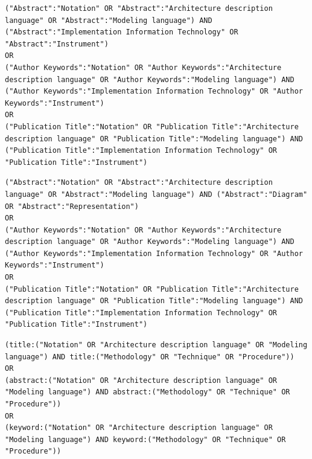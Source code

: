 \begin{tcolorbox}[
	colback=gray!5,
	colframe=black!60,
	title=Cadena de búsqueda en IEEE Xplore para ``Tecnología'',
	fonttitle=\bfseries,
	sharp corners=south
]
\scriptsize
\begin{lstlisting}[breaklines=true]
("Abstract":"Notation" OR "Abstract":"Architecture description language" OR "Abstract":"Modeling language") AND ("Abstract":"Implementation Information Technology" OR "Abstract":"Instrument") 
OR 
("Author Keywords":"Notation" OR "Author Keywords":"Architecture description language" OR "Author Keywords":"Modeling language") AND ("Author Keywords":"Implementation Information Technology" OR "Author Keywords":"Instrument") 
OR 
("Publication Title":"Notation" OR "Publication Title":"Architecture description language" OR "Publication Title":"Modeling language") AND ("Publication Title":"Implementation Information Technology" OR "Publication Title":"Instrument")
\end{lstlisting}
\end{tcolorbox}

\begin{tcolorbox}[
	colback=gray!5,
	colframe=black!60,
	title=Cadena de búsqueda en IEEE Xplore para ``Diseño'',
	fonttitle=\bfseries,
	sharp corners=south
]
\scriptsize
\begin{lstlisting}[breaklines=true]
("Abstract":"Notation" OR "Abstract":"Architecture description language" OR "Abstract":"Modeling language") AND ("Abstract":"Diagram" OR "Abstract":"Representation") 
OR 
("Author Keywords":"Notation" OR "Author Keywords":"Architecture description language" OR "Author Keywords":"Modeling language") AND ("Author Keywords":"Implementation Information Technology" OR "Author Keywords":"Instrument") 
OR 
("Publication Title":"Notation" OR "Publication Title":"Architecture description language" OR "Publication Title":"Modeling language") AND ("Publication Title":"Implementation Information Technology" OR "Publication Title":"Instrument")
\end{lstlisting}
\end{tcolorbox}

\begin{tcolorbox}[
	colback=gray!5,
	colframe=black!60,
	title=Cadena de búsqueda en Springer para ``Metodología'',
	fonttitle=\bfseries,
	sharp corners=south
]
\scriptsize
\begin{lstlisting}[breaklines=true]
(title:("Notation" OR "Architecture description language" OR "Modeling language") AND title:("Methodology" OR "Technique" OR "Procedure"))
OR
(abstract:("Notation" OR "Architecture description language" OR "Modeling language") AND abstract:("Methodology" OR "Technique" OR "Procedure"))
OR 
(keyword:("Notation" OR "Architecture description language" OR "Modeling language") AND keyword:("Methodology" OR "Technique" OR "Procedure"))
\end{lstlisting}
\end{tcolorbox}

